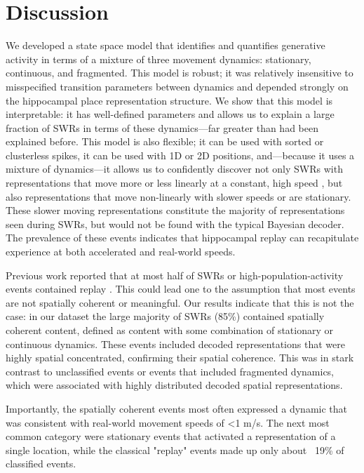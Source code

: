 \documentclass[times, twoside]{zHenriquesLab-StyleBioRxiv}
\begin{document}
\section*{Discussion}
We developed a state space model that identifies and quantifies generative activity in terms of a mixture of three movement dynamics: stationary, continuous, and fragmented. This model is robust; it was relatively insensitive to misspecified transition parameters between dynamics and depended strongly on the hippocampal place representation structure. We show that this model is interpretable: it has well-defined parameters and allows us to explain a large fraction of SWRs in terms of these dynamics---far greater than had been explained before. This model is also flexible; it can be used with sorted or clusterless spikes, it can be used with 1D or 2D positions, and---because it uses a mixture of dynamics---it allows us to confidently discover not only SWRs with representations that move more or less linearly at a constant, high speed , but also representations that move non-linearly  with slower speeds or are stationary. These slower moving representations constitute the majority of representations seen during SWRs, but would not be found with the typical Bayesian decoder. The prevalence of these events indicates that hippocampal replay can recapitulate experience at both accelerated and real-world speeds.

Previous work reported that at most half of SWRs or high-population-activity events contained replay \cite{KarlssonAwakereplayremote2009, FosterReversereplaybehavioural2006, DavidsonHippocampalReplayExtended2009}. This could lead one to the assumption that most events are not spatially coherent or meaningful. Our results indicate that this is not the case: in our dataset the large majority of SWRs (85\%) contained spatially coherent content, defined as content with some combination of stationary or continuous dynamics. These events included decoded representations that were highly spatial concentrated, confirming their spatial coherence. This was in stark contrast to unclassified events or events that included fragmented dynamics, which were associated with highly distributed decoded spatial representations. 

Importantly, the spatially coherent events most often expressed a dynamic that was consistent with real-world movement speeds of <1 m/s. The next most common category were stationary events \cite{JaiDistincthippocampalcorticalmemory2017, FarooqEmergencepreconfiguredplastic2019} that activated a representation of a single location, while the classical "replay" events made up only about ~19\% of classified events. 
\end{document}
